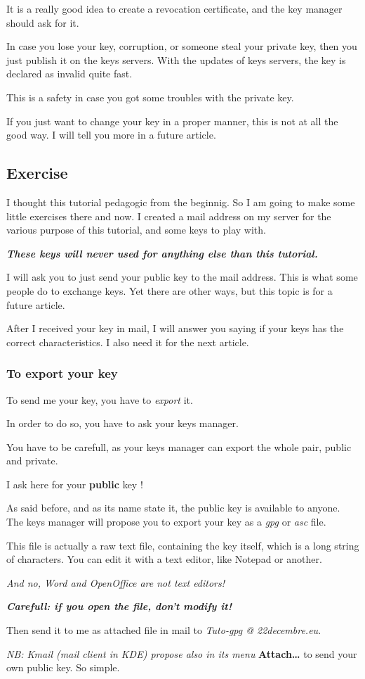 It is a really good idea to create a revocation certificate, and the key
manager should ask for it.

In case you lose your key, corruption, or someone steal your private
key, then you just publish it on the keys servers. With the updates of
keys servers, the key is declared as invalid quite fast.

This is a safety in case you got some troubles with the private key.

If you just want to change your key in a proper manner, this is not at
all the good way. I will tell you more in a future article.

\subsection{Exercise}\label{exercise}

I thought this tutorial pedagogic from the beginnig. So I am going to
make some little exercises there and now. I created a mail address on my
server for the various purpose of this tutorial, and some keys to play
with.

\textbf{\emph{These keys will never used for anything else than this
tutorial.}}

I will ask you to just send your public key to the mail address. This is
what some people do to exchange keys. Yet there are other ways, but this
topic is for a future article.

After I received your key in mail, I will answer you saying if your keys
has the correct characteristics. I also need it for the next article.

\subsubsection{To export your key}\label{to-export-your-key}

To send me your key, you have to \emph{export} it.

In order to do so, you have to ask your keys manager.

You have to be carefull, as your keys manager can export the whole pair,
public and private.

I ask here for your \textbf{public} key !

As said before, and as its name state it, the public key is available to
anyone. The keys manager will propose you to export your key as a
\emph{gpg} or \emph{asc} file.

This file is actually a raw text file, containing the key itself, which
is a long string of characters. You can edit it with a text editor, like
Notepad or another.

\emph{And no, Word and OpenOffice are not text editors!}

\textbf{\emph{Carefull: if you open the file, don't modify it!}}

Then send it to me as attached file in mail to \emph{Tuto-gpg @
22decembre.eu}.

\emph{NB: Kmail (mail client in KDE) propose also in its menu
}\textbf{Attach\ldots{}} to send your own public key. So simple.